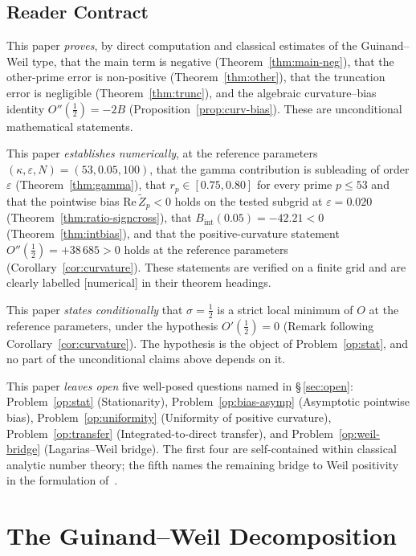 \documentclass[11pt]{article}
\newcommand{\Zt}{\widetilde{Z}}
\begin{document}
\subsection{Reader Contract}

This paper \emph{proves}, by direct computation and classical estimates
of the Guinand--Weil type, that the main term is negative
(Theorem~\ref{thm:main-neg}), that the other-prime error is
non-positive (Theorem~\ref{thm:other}), that the truncation error is
negligible (Theorem~\ref{thm:trunc}), and the algebraic
curvature--bias identity $O''(\tfrac12)=-2B$
(Proposition~\ref{prop:curv-bias}).
These are unconditional mathematical statements.

This paper \emph{establishes numerically}, at the reference parameters
$(\kappa,\varepsilon,N)=(53,0.05,100)$, that the gamma contribution is
subleading of order $\varepsilon$ (Theorem~\ref{thm:gamma}), that
$r_p\in[0.75,0.80]$ for every prime $p\le 53$ and that the pointwise
bias $\mathrm{Re}\,\Zt_p<0$ holds on the tested subgrid at
$\varepsilon=0.020$ (Theorem~\ref{thm:ratio-signcross}), that
$B_{\mathrm{int}}(0.05)=-42.21<0$ (Theorem~\ref{thm:intbias}), and that
the positive-curvature statement $O''(\tfrac12)=+38\,685>0$ holds at
the reference parameters (Corollary~\ref{cor:curvature}).
These statements are verified on a finite grid and are clearly labelled
[numerical] in their theorem headings.

This paper \emph{states conditionally} that $\sigma=\tfrac12$ is a
strict local minimum of $O$ at the reference parameters, under the
hypothesis $O'(\tfrac12)=0$ (Remark following
Corollary~\ref{cor:curvature}).
The hypothesis is the object of Problem~\ref{op:stat}, and no part of
the unconditional claims above depends on it.

This paper \emph{leaves open} five well-posed questions named in
\S\,\ref{sec:open}: Problem~\ref{op:stat} (Stationarity),
Problem~\ref{op:bias-asymp} (Asymptotic pointwise bias),
Problem~\ref{op:uniformity} (Uniformity of positive curvature),
Problem~\ref{op:transfer} (Integrated-to-direct transfer), and
Problem~\ref{op:weil-bridge} (Lagarias--Weil bridge).
The first four are self-contained within classical analytic number
theory; the fifth names the remaining bridge to Weil positivity in
the formulation of~\cite{Lagarias}.

\section{The Guinand--Weil Decomposition}
\label{sec:gw}
\end{document}

